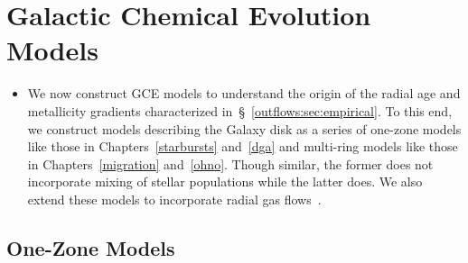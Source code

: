 
\section{Galactic Chemical Evolution Models}
\label{outflows:sec:gce}
\begin{itemize}

	\item We now construct GCE models to understand the origin of the radial
	age and metallicity gradients characterized
	in~\S~\ref{outflows:sec:empirical}.
	To this end, we construct models describing the Galaxy disk as a series of
	one-zone models like those in Chapters~\ref{starbursts} and~\ref{dga} and
	multi-ring models like those in Chapters~\ref{migration} and~\ref{ohno}.
	Though similar, the former does not incorporate mixing of stellar
	populations while the latter does.
	We also extend these models to incorporate radial gas
	flows~\citep[e.g.,][]{Lacey1985, Bilitewski2012}.

\end{itemize}

\subsection{One-Zone Models}
\label{outflows:sec:gce:onezone}

